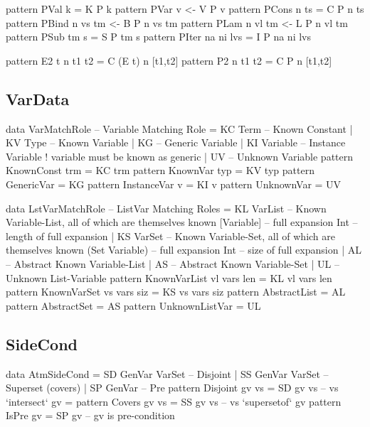 \begin{code}
pattern PVal k             =  K P k
pattern PVar v            <-  V P v
pattern PCons n ts         =  C P n ts
pattern PBind n vs tm     <-  B P n vs tm
pattern PLam n vl tm      <-  L P n vl tm
pattern PSub tm s          =  S P tm s
pattern PIter na ni lvs    =  I P na ni lvs
\end{code}

\begin{code}
pattern E2 t n t1 t2  = C (E t) n [t1,t2]
pattern P2   n t1 t2  = C P     n [t1,t2]
\end{code}

\subsection{VarData}

\begin{code}
data VarMatchRole -- Variable Matching Role
  =  KC Term     -- Known Constant
  |  KV Type     -- Known Variable
  |  KG          -- Generic Variable
  |  KI Variable -- Instance Variable ! variable must be known as generic
  |  UV          -- Unknown Variable
pattern KnownConst trm = KC trm
pattern KnownVar typ   = KV typ
pattern GenericVar     = KG
pattern InstanceVar v  = KI v
pattern UnknownVar     = UV
\end{code}

\begin{code}
data LstVarMatchRole -- ListVar Matching Roles
 = KL VarList        -- Known Variable-List, all of which are themselves known
      [Variable]     -- full expansion
      Int            -- length of full expansion
 | KS VarSet         -- Known Variable-Set, all of which are themselves known
      (Set Variable) -- full expansion
      Int            -- size of full expansion
 | AL                -- Abstract Known Variable-List
 | AS                -- Abstract Known Variable-Set
 | UL                -- Unknown List-Variable
pattern KnownVarList vl vars len  =  KL vl vars len
pattern KnownVarSet  vs vars siz  =  KS vs vars siz
pattern AbstractList              =  AL
pattern AbstractSet               =  AS
pattern UnknownListVar            =  UL
\end{code}

\subsection{SideCond}

\begin{code}
data AtmSideCond
 = SD  GenVar VarSet -- Disjoint
 | SS  GenVar VarSet -- Superset (covers)
 | SP  GenVar        -- Pre
pattern Disjoint gv vs = SD  gv vs  --  vs `intersect`  gv = {}
pattern Covers   gv vs = SS  gv vs  --  vs `supersetof` gv
pattern IsPre    gv    = SP  gv     --  gv is pre-condition
\end{code}

